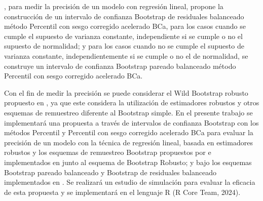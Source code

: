 \textcite{balam-2012}, para medir la precisión de un modelo con regresión lineal, propone la construcción de un intervalo de confianza Bootstrap de residuales balanceado método Percentil con sesgo corregido acelerado BCa, para los casos cuando se cumple el supuesto de varianza constante, independiente si se cumple o no el supuesto de normalidad; y para los casos cuando no se cumple el supuesto de varianza constante, independientemente si se cumple o no el de normalidad, se construye un intervalo de confianza Bootstrap pareado balanceado método Percentil con sesgo corregido acelerado BCa.
\vspace{.5cm}

Con el fin de medir la precisión se puede considerar el Wild Bootstrap robusto propuesto en \textcite{rana-2012}, ya que este considera la utilización de estimadores robustos y otros esquemas de remuestreo diferente al Bootstrap simple.
En el presente trabajo se implementará una propuesta a través de intervalos de confianza Bootstrap con los métodos Percentil y Percentil con sesgo corregido acelerado BCa para evaluar la precisión de un modelo con la técnica de regresión lineal, basada en estimadores robustos y los esquemas de remuestreo Bootstrap propuestos por \textcite{rana-2012} e implementados en \textcite{zacarias-2023} junto al esquema de Bootstrap Robusto; y bajo los esquemas Bootstrap pareado balanceado y Bootstrap de residuales balanceado implementados en \textcite{balam-2012}. Se realizará un estudio de simulación para evaluar la eficacia de esta propuesta y se implementará en el lenguaje R (R Core Team, 2024).
